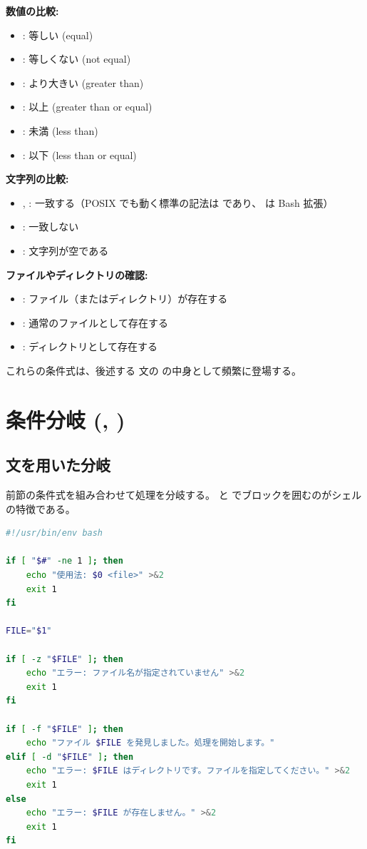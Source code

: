 \textbf{数値の比較:}
\begin{itemize}
    \item {}: 等しい (equal)
    \item {}: 等しくない (not equal)
    \item {}: より大きい (greater than)
    \item {}: 以上 (greater than or equal)
    \item {}: 未満 (less than)
    \item {}: 以下 (less than or equal)
\end{itemize}

\textbf{文字列の比較:}
\begin{itemize}
    \item \code{=}, \code{==}: 一致する（POSIX  でも動く標準の記法は \code{=} であり、\code{==} は Bash 拡張）
    \item \code{!=}: 一致しない
    \item {}: 文字列が空である
\end{itemize}

\textbf{ファイルやディレクトリの確認:}
\begin{itemize}
    \item {}: ファイル（またはディレクトリ）が存在する
    \item {}: 通常のファイルとして存在する
    \item {}: ディレクトリとして存在する
\end{itemize}

これらの条件式は、後述する  文の \code{[ ]} の中身として頻繁に登場する。

\section{条件分岐 (, )}

\subsection{ 文を用いた分岐}

前節の条件式を組み合わせて処理を分岐する。 と  でブロックを囲むのがシェルの特徴である。

\begin{lstlisting}[language=bash]
#!/usr/bin/env bash

if [ "$#" -ne 1 ]; then
    echo "使用法: $0 <file>" >&2
    exit 1
fi

FILE="$1"

if [ -z "$FILE" ]; then
    echo "エラー: ファイル名が指定されていません" >&2
    exit 1
fi

if [ -f "$FILE" ]; then
    echo "ファイル $FILE を発見しました。処理を開始します。"
elif [ -d "$FILE" ]; then
    echo "エラー: $FILE はディレクトリです。ファイルを指定してください。" >&2
    exit 1
else
    echo "エラー: $FILE が存在しません。" >&2
    exit 1
fi
\end{lstlisting}

